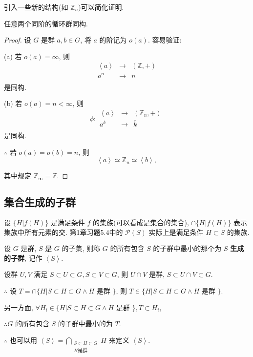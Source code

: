 \documentclass{ctexart}
\begin{document}
引入一些新的结构(如 $\mathbb{Z}_n$)可以简化证明.
\begin{theorem}[书上的定理3]
    任意两个同阶的循环群同构.
\end{theorem}
\begin{proof}
    设 $G$ 是群 $a,b\in G$, 将 $a$ 的阶记为 $o(a)$. 容易验证:

    (a) 若 $o(a)=\infty$, 则
    \[\begin{array}{rcl}
        \left<a\right> & \to & (\mathbb{Z},+) \\
        a^n & \to & n \\
    \end{array}\]
    是同构.

    (b) 若 $o(a)=n<\infty$, 则
    \[\phi:\begin{array}{rcl}
        \left<a\right> & \to & (\mathbb{Z}_n,+) \\
        a^k & \to & \overline{k} \\
    \end{array}\]
    是同构.

    $\therefore$ 若 $o(a)=o(b)=n$, 则
    \[\left<a\right>\simeq\mathbb{Z}_n\simeq\left<b\right>,\]

    其中规定 $\mathbb{Z}_\infty=\mathbb{Z}$.
\end{proof}
\subsection{集合生成的子群}
设 $\{H|f(H)\}$ 是满足条件 $f$ 的集族(可以看成是集合的集合), $\cap\{H|f(H)\}$ 表示集族中所有元素的交. 第1章习题5.4中的 $\mathcal{P}(S)$ 实际上是满足条件 $H\subset S$ 的集族.
\begin{definition}
    设 $G$ 是群, $S$ 是 $G$ 的子集, 则称 $G$ 的所有包含 $S$ 的子群中最小的那个为 $S$ \textbf{生成的子群}, 记作 $\left<S\right>$.
\end{definition}

设群 $U,V$ 满足 $S\subset U\subset G,S\subset V\subset G$, 则 $U\cap V$ 是群, $S\subset U\cap V\subset G$.

$\therefore$ 设 $T=\cap\{H|S\subset H\subset G\land H$ 是群 $\}$, 则 $T\in\{H|S\subset H\subset G\land H$ 是群 $\}$.

另一方面, $\forall H_i\in\{H|S\subset H\subset G\land H$ 是群 $\},T\subset H_i$,

$\therefore G$ 的所有包含 $S$ 的子群中最小的为 $T$.

$\therefore$ 也可以用 $\left<S\right>=\bigcap\limits_{\substack{S\subset H\subset G\\H\text{是群}}}H$ 来定义 $\left<S\right>$.
\end{document}
